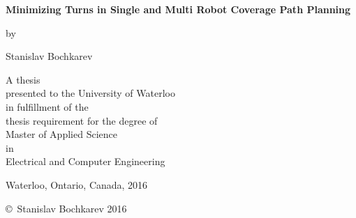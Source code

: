 \pagestyle{empty}

\begin{titlepage}
        \begin{center}
        \vspace*{1.0cm}

        \Huge
        {\bf Minimizing Turns in Single and Multi Robot Coverage Path Planning}

        \vspace*{1.0cm}

        \normalsize
        by \\

        \vspace*{1.0cm}

        \Large
        Stanislav Bochkarev \\

        \vspace*{3.0cm}

        \normalsize
        A thesis \\
        presented to the University of Waterloo \\ 
        in fulfillment of the \\
        thesis requirement for the degree of \\
        Master of Applied Science \\
        in \\
        Electrical and Computer Engineering \\

        \vspace*{2.0cm}

        Waterloo, Ontario, Canada, 2016 \\

        \vspace*{1.0cm}

        \copyright\ Stanislav Bochkarev 2016 \\
        \end{center}
\end{titlepage}

\pagestyle{plain}
\setcounter{page}{2}

